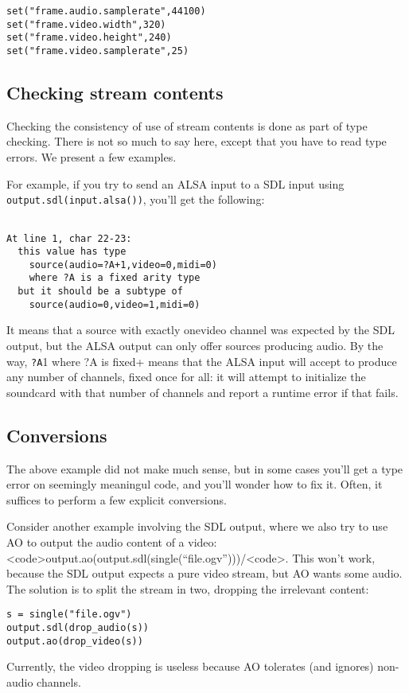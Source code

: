 \begin{verbatim}
set("frame.audio.samplerate",44100)
set("frame.video.width",320)
set("frame.video.height",240)
set("frame.video.samplerate",25)
\end{verbatim}
\subsection{Checking stream contents}
Checking the consistency of use of stream contents is done as part
of type checking. There is not so much to say here, except that you
have to read type errors. We present a few examples.

For example, if you try to send an ALSA input to a SDL input using
\verb+output.sdl(input.alsa())+, you'll get the following:

\begin{verbatim}

At line 1, char 22-23:
  this value has type
    source(audio=?A+1,video=0,midi=0)
    where ?A is a fixed arity type
  but it should be a subtype of
    source(audio=0,video=1,midi=0)
\end{verbatim}
It means that a source with exactly onevideo channel was expected
by the SDL output, but the ALSA output can only offer sources
producing audio.
By the way,
\verb+?A+1 where ?A is fixed+ means that the ALSA input will
accept to produce any number of channels, fixed once for
all: it will attempt to initialize the soundcard with that number of
channels and report a runtime error if that fails.

\subsection{Conversions}
The above example did not make much sense, but in some cases you'll
get a type error on seemingly meaningul code, and you'll wonder how
to fix it. Often, it suffices to perform a few explicit conversions.

Consider another example involving the SDL output, where we also try
to use AO to output the audio content of a video:
<code>output.ao(output.sdl(single(``file.ogv'')))/<code>.
This won't work, because the SDL output expects a pure video stream,
but AO wants some audio. The solution is to split the stream in
two, dropping the irrelevant content:

\begin{verbatim}
s = single("file.ogv")
output.sdl(drop_audio(s))
output.ao(drop_video(s))
\end{verbatim}
Currently, the video dropping is useless because AO tolerates
(and ignores) non-audio channels.

